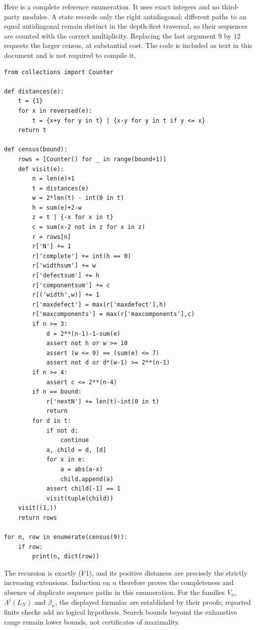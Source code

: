 \documentclass[11pt,a4paper]{article}
\theoremstyle{definition}
\theoremstyle{remark}
\numberwithin{equation}{section}
\begin{document}
Here is a complete reference enumeration. It uses exact integers and no
third-party modules. A state records only the right antidiagonal; different
paths to an equal antidiagonal remain distinct in the depth-first traversal,
so their sequences are counted with the correct multiplicity. Replacing the
last argument $9$ by $12$ requests the larger census, at substantial cost.
The code is included as text in this document and is not required to compile it.
\begin{verbatim}
from collections import Counter

def distances(e):
    t = {1}
    for x in reversed(e):
        t = {x+y for y in t} | {x-y for y in t if y <= x}
    return t

def census(bound):
    rows = [Counter() for _ in range(bound+1)]
    def visit(e):
        n = len(e)+1
        t = distances(e)
        w = 2*len(t) - int(0 in t)
        h = sum(e)+2-w
        z = t | {-x for x in t}
        c = sum(x-2 not in z for x in z)
        r = rows[n]
        r['N'] += 1
        r['complete'] += int(h == 0)
        r['widthsum'] += w
        r['defectsum'] += h
        r['componentsum'] += c
        r[('width',w)] += 1
        r['maxdefect'] = max(r['maxdefect'],h)
        r['maxcomponents'] = max(r['maxcomponents'],c)
        if n >= 3:
            d = 2**(n-1)-1-sum(e)
            assert not h or w >= 10
            assert (w <= 9) == (sum(e) <= 7)
            assert not d or d*(w-1) >= 2**(n-1)
        if n >= 4:
            assert c <= 2**(n-4)
        if n == bound:
            r['nextN'] += len(t)-int(0 in t)
            return
        for d in t:
            if not d:
                continue
            a, child = d, [d]
            for x in e:
                a = abs(a-x)
                child.append(a)
            assert child[-1] == 1
            visit(tuple(child))
    visit((1,))
    return rows

for n, row in enumerate(census(9)):
    if row:
        print(n, dict(row))
\end{verbatim}
The recursion is exactly (F1), and its positive distances are precisely the
strictly increasing extensions. Induction on $n$ therefore proves the
completeness and absence of duplicate sequence paths in this enumeration.
For the families $V_n$, $\Lambda^j(L_N)$ and $\beta_n$, the displayed formulas
are established by their proofs; reported finite checks add no logical
hypothesis. Search bounds beyond the exhaustive range remain lower bounds,
not certificates of maximality.
\end{document}
